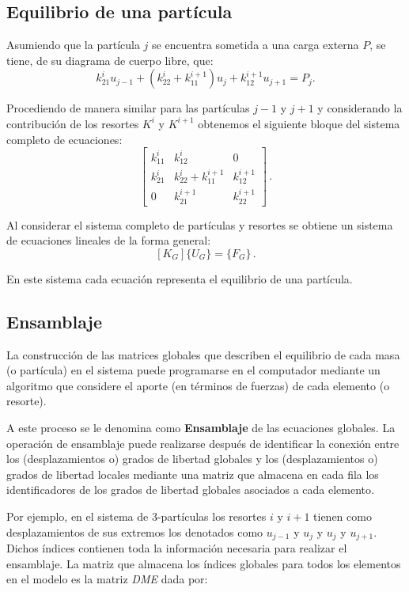 \subsection{Equilibrio de una partícula}
Asumiendo que la partícula $j$ se encuentra sometida a una carga externa $P$, 
se tiene, de su diagrama de cuerpo libre, que:
$$
k_{21}^i u_{j - 1} + (k_{22}^i + k_{11}^{i + 1}) u_j + k_{12}^{i + 1} u_{j + 1} 
= P_j.
$$

Procediendo de manera similar para las partículas ${j-1}$ y ${j+1}$ y 
considerando la contribución de los resortes $K^i$ y $K^{i+1}$ obtenemos el 
siguiente bloque del sistema completo de ecuaciones:
$$\begin{bmatrix}
k_{11}^i &k_{12}^i &0\\
k_{21}^i &k_{22}^i + k_{11}^{i + 1} &k_{12}^{i + 1}\\
0 &k_{21}^{i + 1} &k_{22}^{i + 1}
\end{bmatrix}\, . $$

Al considerar el sistema completo de partículas y resortes se obtiene un 
sistema de ecuaciones lineales de la forma general:
$$
[K_G] \{U_G\}  = \{F_G\}\, .
$$

En este sistema cada ecuación representa el equilibrio de una partícula.

\subsection{Ensamblaje}
La construcción de las matrices globales que describen el equilibrio de cada 
masa (o partícula) en el sistema puede programarse en el computador mediante un 
algoritmo que considere el aporte (en términos de fuerzas) de cada elemento (o 
resorte).

A este proceso se le denomina como \textbf{Ensamblaje} de las ecuaciones 
globales. La operación de ensamblaje puede realizarse después de identificar la 
conexión entre los (desplazamientos o) grados de libertad globales y los 
(desplazamientos o) grados de libertad locales mediante una matriz que almacena 
en cada fila los identificadores de los grados de libertad globales asociados a 
cada elemento.

Por ejemplo, en el sistema de 3-partículas los resortes $i$ y $i+1$ tienen como 
desplazamientos de sus extremos los denotados como $u_{j-1}$ y $u_j$ y $u_j$ y 
$u_{j+1}$. Dichos índices contienen toda la información necesaria para realizar 
el ensamblaje. La matriz que almacena los índices globales para todos los 
elementos en el modelo es la matriz \textit{DME} dada por:

